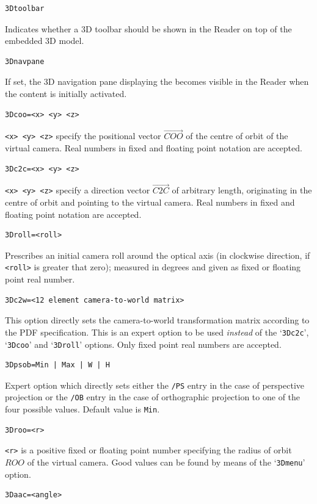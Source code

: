 \documentclass[a4paper]{article}
\begin{document}
\begin{verbatim}
3Dtoolbar
\end{verbatim}
Indicates whether a 3D toolbar should be shown in the Reader on top of the embedded 3D model.
\begin{verbatim}
3Dnavpane
\end{verbatim}
If set, the 3D navigation pane displaying the  becomes visible in the Reader when the content is initially activated.
\begin{verbatim}
3Dcoo=<x> <y> <z>
\end{verbatim}
\verb+<x> <y> <z>+ specify the positional vector $\overrightarrow{COO}$ of the centre of orbit of the virtual camera. Real numbers in fixed and floating point notation are accepted.
\begin{verbatim}
3Dc2c=<x> <y> <z>
\end{verbatim}
\verb+<x> <y> <z>+ specify a direction vector $\overrightarrow{C2C}$ of arbitrary length, originating in the centre of orbit and pointing to the virtual camera. Real numbers in fixed and floating point notation are accepted.
\begin{verbatim}
3Droll=<roll>
\end{verbatim}
Prescribes an initial camera roll around the optical axis (in clockwise direction, if \verb+<roll>+ is greater that zero); measured in degrees and given as fixed or floating point real number.
\begin{verbatim}
3Dc2w=<12 element camera-to-world matrix>
\end{verbatim}
This option directly sets the camera-to-world transformation matrix according to the PDF specification. This is an expert option to be used \emph{instead} of the `\verb+3Dc2c+', `\verb+3Dcoo+' and `\verb+3Droll+' options. Only fixed point real numbers are accepted.
\begin{verbatim}
3Dpsob=Min | Max | W | H
\end{verbatim}
Expert option which directly sets either the \verb+/PS+ entry in the case of perspective projection or the \verb+/OB+ entry in the case of orthographic projection to one of the four possible values. Default value is \verb+Min+.
\begin{verbatim}
3Droo=<r>
\end{verbatim}
\verb+<r>+ is a positive fixed or floating point number specifying the radius of orbit $ROO$ of the virtual camera. Good values can be found by means of the `\verb+3Dmenu+' option.
\begin{verbatim}
3Daac=<angle>
\end{verbatim}
\end{document}
